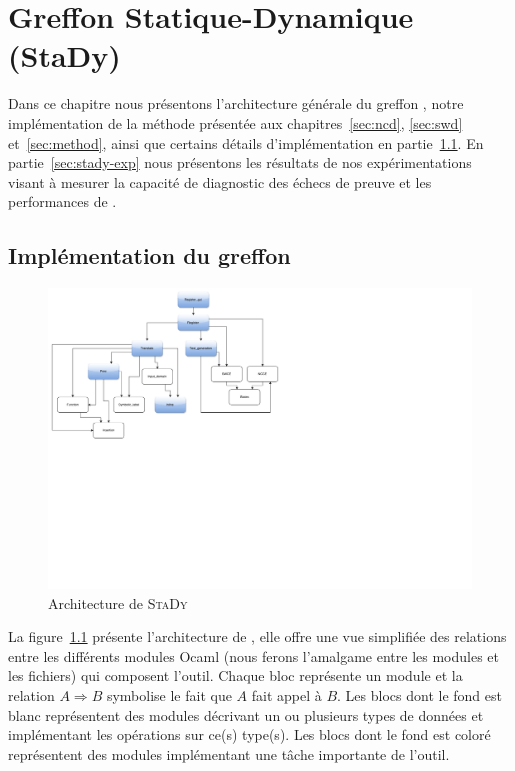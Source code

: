 
\chapter{Greffon Statique-Dynamique (StaDy)}
\label{sec:stady}

\chapterintro


Dans ce chapitre nous présentons l'architecture générale du greffon \stady,
notre implémentation de la méthode présentée aux chapitres~\ref{sec:ncd},
\ref{sec:swd} et~\ref{sec:method}, ainsi que certains détails d'implémentation
en partie~\ref{sec:stady-implem}.
En partie~\ref{sec:stady-exp} nous présentons les résultats de nos
expérimentations visant à mesurer la capacité de diagnostic des échecs de preuve
et les performances de \stady.


\section{Implémentation du greffon \stady}
\label{sec:stady-implem}


\begin{center}
  \begin{figure}[tb]
    \includegraphics[scale=.5]{figures/stady_architecture.pdf}
    \vspace{-11cm}
    \caption{Architecture de \textsc{StaDy}
      \label{fig:stady-architecture}}
  \end{figure}
\end{center}


La figure~\ref{fig:stady-architecture} présente l'architecture de \stady, elle
offre une vue simplifiée des relations entre les différents modules Ocaml (nous
ferons l'amalgame entre les modules et les fichiers) qui composent l'outil.
Chaque bloc représente un module et la relation $A \Rightarrow B$ symbolise le
fait que $A$ fait appel à $B$.
Les blocs dont le fond est blanc représentent des modules décrivant un ou
plusieurs types de données et implémentant les opérations sur ce(s) type(s).
Les blocs dont le fond est coloré représentent des modules implémentant une
tâche importante de l'outil.

